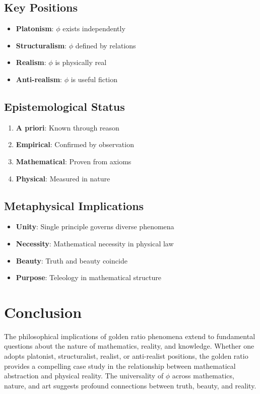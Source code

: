 \subsection{Key Positions}

\begin{itemize}
    \item \textbf{Platonism}: $\phi$ exists independently
    \item \textbf{Structuralism}: $\phi$ defined by relations
    \item \textbf{Realism}: $\phi$ is physically real
    \item \textbf{Anti-realism}: $\phi$ is useful fiction
\end{itemize}

\subsection{Epistemological Status}

\begin{enumerate}
    \item \textbf{A priori}: Known through reason
    \item \textbf{Empirical}: Confirmed by observation
    \item \textbf{Mathematical}: Proven from axioms
    \item \textbf{Physical}: Measured in nature
\end{enumerate}

\subsection{Metaphysical Implications}

\begin{itemize}
    \item \textbf{Unity}: Single principle governs diverse phenomena
    \item \textbf{Necessity}: Mathematical necessity in physical law
    \item \textbf{Beauty}: Truth and beauty coincide
    \item \textbf{Purpose}: Teleology in mathematical structure
\end{itemize}

\section{Conclusion}

The philosophical implications of golden ratio phenomena extend to fundamental questions about the nature of mathematics, reality, and knowledge. Whether one adopts platonist, structuralist, realist, or anti-realist positions, the golden ratio provides a compelling case study in the relationship between mathematical abstraction and physical reality. The universality of $\phi$ across mathematics, nature, and art suggests profound connections between truth, beauty, and reality.

